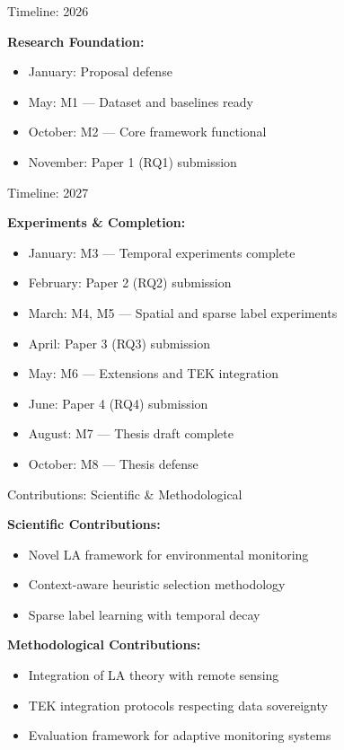 \documentclass[10pt,xcolor={table,dvipsnames},t]{beamer}
\begin{document}
\begin{frame}{Timeline: 2026}

\textbf{Research Foundation:}
\begin{itemize}
  \item January: Proposal defense
  \item May: M1 --- Dataset and baselines ready
  \item October: M2 --- Core framework functional
  \item November: Paper 1 (RQ1) submission
\end{itemize}

\end{frame}

\begin{frame}{Timeline: 2027}

\textbf{Experiments \& Completion:}
\begin{itemize}
  \item January: M3 --- Temporal experiments complete
  \item February: Paper 2 (RQ2) submission
  \item March: M4, M5 --- Spatial and sparse label experiments
  \item April: Paper 3 (RQ3) submission
  \item May: M6 --- Extensions and TEK integration
  \item June: Paper 4 (RQ4) submission
  \item August: M7 --- Thesis draft complete
  \item October: M8 --- Thesis defense
\end{itemize}

\end{frame}

\begin{frame}{Contributions: Scientific \& Methodological}

\textbf{Scientific Contributions:}
\begin{itemize}
  \item Novel LA framework for environmental monitoring
  \item Context-aware heuristic selection methodology
  \item Sparse label learning with temporal decay
\end{itemize}

\vspace{0.5em}
\textbf{Methodological Contributions:}
\begin{itemize}
  \item Integration of LA theory with remote sensing
  \item TEK integration protocols respecting data sovereignty
  \item Evaluation framework for adaptive monitoring systems
\end{itemize}

\end{frame}
\end{document}
